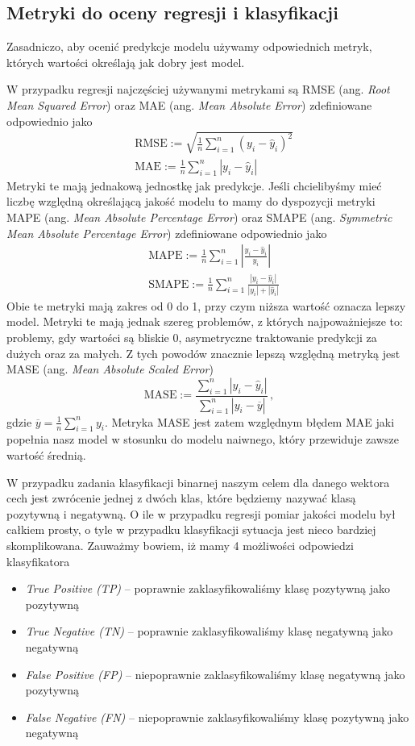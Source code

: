\documentclass{myclass}
\begin{document}
\subsection{Metryki do oceny regresji i klasyfikacji}

Zasadniczo, aby ocenić predykcje modelu używamy odpowiednich metryk, których wartości określają jak
dobry jest model.

W przypadku regresji najczęściej używanymi metrykami są RMSE (ang. \emph{Root Mean Squared Error})
oraz MAE (ang. \emph{Mean Absolute Error}) zdefiniowane odpowiednio jako
\[
\begin{split}
    & \mathrm{RMSE} := \sqrt{\frac{1}{n}\sum_{i=1}^n (y_i - \hat{y}_i)^2}\\
    & \mathrm{MAE} := \frac{1}{n}\sum_{i=1}^n|y_i - \hat{y}_i|
\end{split}
\]
Metryki te mają jednakową jednostkę jak predykcje. Jeśli chcielibyśmy mieć liczbę względną
określającą jakość modelu to mamy do dyspozycji metryki MAPE (ang. \emph{Mean Absolute Percentage
Error}) oraz SMAPE (ang. \emph{Symmetric Mean Absolute Percentage Error}) zdefiniowane odpowiednio
jako
\[
\begin{split}
    &\mathrm{MAPE} := \frac{1}{n}\sum_{i=1}^n\left|\frac{y_i - \hat{y}_i}{y_i}\right|\\
    &\mathrm{SMAPE} := \frac{1}{n}\sum_{i=1}^n \frac{|y_i - \hat{y}_i|}{|y_i| + |\hat{y}_i|}   
\end{split}
\]
Obie te metryki mają zakres od 0 do 1, przy czym niższa wartość oznacza lepszy model. Metryki te
mają jednak szereg problemów, z których najpoważniejsze to: problemy, gdy wartości są bliskie 0,
asymetryczne traktowanie predykcji za dużych oraz za małych. Z tych powodów znacznie lepszą względną
metryką jest MASE (ang. \emph{Mean Absolute Scaled Error})
\[
\mathrm{MASE} := \frac{\sum_{i=1}^n |y_i - \hat{y}_i|}{\sum_{i=1}^n |y_i - \overline{y}|}\,,
\]
gdzie \(\overline{y} = \frac{1}{n}\sum_{i=1}^n y_i\). Metryka MASE jest zatem względnym błędem MAE
jaki popełnia nasz model w stosunku do modelu naiwnego, który przewiduje zawsze wartość średnią.

W przypadku zadania klasyfikacji binarnej naszym celem dla danego wektora cech jest zwrócenie jednej
z dwóch klas, które będziemy nazywać klasą pozytywną i negatywną. O ile w przypadku regresji pomiar
jakości modelu był całkiem prosty, o tyle w przypadku klasyfikacji sytuacja jest nieco bardziej
skomplikowana. Zauważmy bowiem, iż mamy 4 możliwości odpowiedzi klasyfikatora
\begin{itemize}
\item \emph{True Positive (TP)} -- poprawnie zaklasyfikowaliśmy klasę pozytywną jako pozytywną
\item \emph{True Negative (TN)} -- poprawnie zaklasyfikowaliśmy klasę negatywną jako negatywną
\item \emph{False Positive (FP)} -- niepoprawnie zaklasyfikowaliśmy klasę negatywną jako pozytywną
\item \emph{False Negative (FN)} -- niepoprawnie zaklasyfikowaliśmy klasę pozytywną jako negatywną
\end{itemize}
\end{document}
